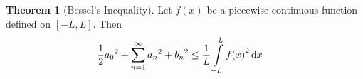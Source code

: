 \documentclass[fleqn, a4paper, 12pt, twoside]{article}
\theoremstyle{definition}
\theoremstyle{theorem}
\newtheorem{theorem}{Theorem}
\begin{document}
\begin{theorem}[Bessel's Inequality]
	Let $f(x)$ be a piecewise continuous function defined on $[-L,L]$.
	Then
	\begin{align*}
		\frac{1}{2} {a_0}^2 + \sum\limits_{n = 1}^{\infty} {a_n}^2 + {b_n}^2 &\le \frac{1}{L} \int\limits_{-L}^{L} {f(x)}^2 \dif x
	\end{align*}
	\label{Bessel's_Inequality}
\end{theorem}
\end{document}
